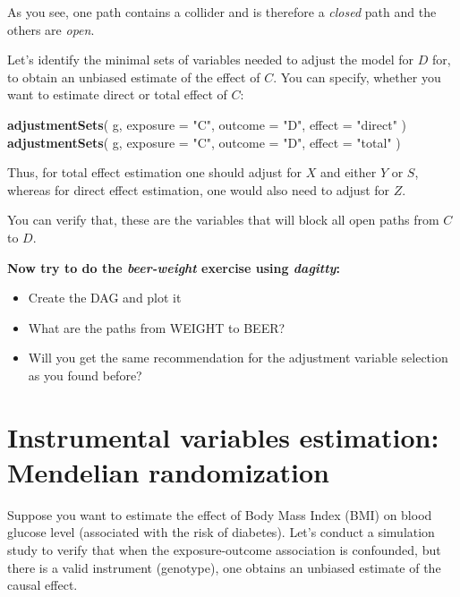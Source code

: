 \documentclass[
]{book}
\newenvironment{Shaded}{\begin{snugshade}}{\end{snugshade}}
\newcommand{\AttributeTok}[1]{\textcolor[rgb]{0.13,0.29,0.53}{#1}}
\newcommand{\FunctionTok}[1]{\textcolor[rgb]{0.13,0.29,0.53}{\textbf{#1}}}
\newcommand{\NormalTok}[1]{#1}
\newcommand{\StringTok}[1]{\textcolor[rgb]{0.31,0.60,0.02}{#1}}
\begin{document}
As you see, one path contains a collider and is therefore a \emph{closed} path and the others are \emph{open}.

Let's identify the minimal sets of variables needed to adjust the model for \(D\) for, to obtain an unbiased estimate of the effect of \(C\). You can specify, whether you want to estimate direct or total effect of \(C\):

\begin{Shaded}
\begin{Highlighting}[]
\FunctionTok{adjustmentSets}\NormalTok{(}
\NormalTok{  g, }\AttributeTok{exposure =} \StringTok{"C"}\NormalTok{, }\AttributeTok{outcome =} \StringTok{"D"}\NormalTok{, }\AttributeTok{effect =} \StringTok{"direct"}
\NormalTok{)}
\FunctionTok{adjustmentSets}\NormalTok{(}
\NormalTok{  g, }\AttributeTok{exposure =} \StringTok{"C"}\NormalTok{, }\AttributeTok{outcome =} \StringTok{"D"}\NormalTok{, }\AttributeTok{effect =} \StringTok{"total"}
\NormalTok{)}
\end{Highlighting}
\end{Shaded}

Thus, for total effect estimation one should adjust for \(X\) and either \(Y\) or \(S\), whereas for direct effect estimation, one would also need to adjust for \(Z\).

You can verify that, these are the variables that will block all open paths from \(C\) to \(D\).

\textbf{Now try to do the \emph{beer-weight} exercise using \emph{dagitty}: }

\begin{itemize}
\item
  Create the DAG and plot it
\item
  What are the paths from WEIGHT to BEER?
\item
  Will you get the same recommendation for the adjustment variable selection as you found before?
\end{itemize}

\section{Instrumental variables estimation: Mendelian randomization}\label{instrumental-variables-estimation-mendelian-randomization}

Suppose you want to estimate the effect of Body Mass Index (BMI) on blood glucose level (associated with the risk of diabetes).
Let's conduct a simulation study to verify that when the exposure-outcome association is confounded, but there is a valid instrument (genotype), one obtains an unbiased estimate of the causal effect.
\end{document}
